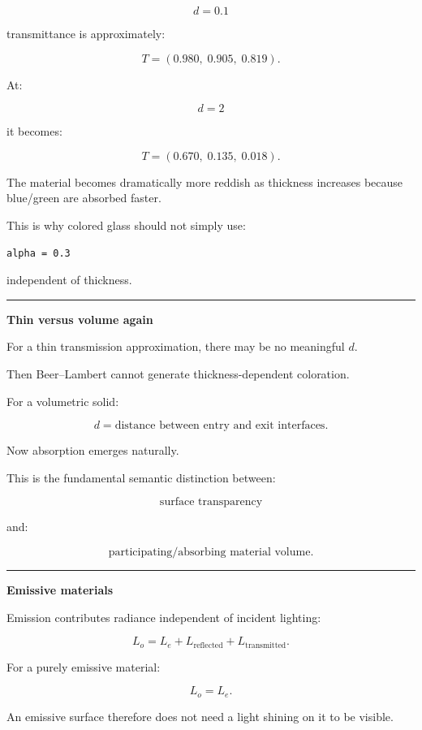\[
d=0.1
\]

transmittance is approximately:

\[
T=
(0.980,\;0.905,\;0.819).
\]

At:

\[
d=2
\]

it becomes:

\[
T=
(0.670,\;0.135,\;0.018).
\]

The material becomes dramatically more reddish as thickness increases because blue/green are absorbed faster.

This is why colored glass should not simply use:

\begin{verbatim}
alpha = 0.3
\end{verbatim}

independent of thickness.

\begin{center}\rule{0.5\linewidth}{0.5pt}\end{center}

\textbf{Thin versus volume again}

For a thin transmission approximation, there may be no meaningful \(d\).

Then Beer--Lambert cannot generate thickness-dependent coloration.

For a volumetric solid:

\[
d=
\text{distance between entry and exit interfaces}.
\]

Now absorption emerges naturally.

This is the fundamental semantic distinction between:

\[
\boxed{\text{surface transparency}}
\]

and:

\[
\boxed{\text{participating/absorbing material volume}}.
\]

\begin{center}\rule{0.5\linewidth}{0.5pt}\end{center}

\textbf{Emissive materials}

Emission contributes radiance independent of incident lighting:

\[
\boxed{
L_o=
L_e+
L_{\text{reflected}}
+
L_{\text{transmitted}}.
}
\]

For a purely emissive material:

\[
L_o=L_e.
\]

An emissive surface therefore does not need a light shining on it to be visible.

